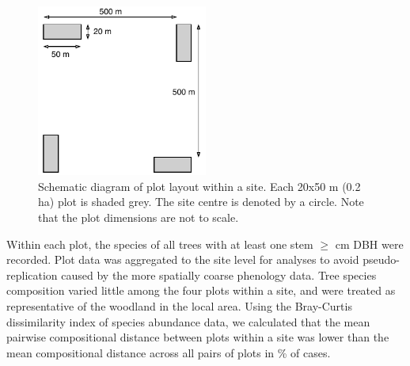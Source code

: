 \documentclass[11pt,a4paper]{article}
\begin{document}
\begin{figure}[H]
\centering
	\includegraphics[width=0.5\textwidth]{schematic.drawio}
	\caption{Schematic diagram of plot layout within a site. Each 20x50 m (0.2 ha) plot is shaded grey. The site centre is denoted by a circle. Note that the plot dimensions are not to scale.}
	\label{schematic}
\end{figure}

Within each plot, the species of all trees with at least one stem $\geq$\stemSize{} cm DBH were recorded. Plot data was aggregated to the site level for analyses to avoid pseudo-replication caused by the more spatially coarse phenology data. Tree species composition varied little among the four plots within a site, and were treated as representative of the woodland in the local area. Using the Bray-Curtis dissimilarity index of species abundance data, we calculated that the mean pairwise compositional distance between plots within a site was lower than the mean compositional distance across all pairs of plots in \plotDistPer{}\% of cases. 
\end{document}

